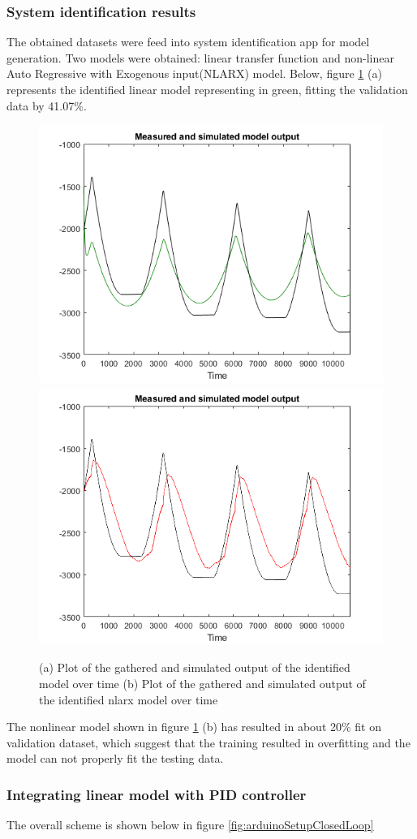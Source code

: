 \documentclass[]{final_report}
\begin{document}
\subsubsection{System identification results}
The obtained datasets were feed into system identification app for model generation.
Two models were obtained: linear transfer function and non-linear Auto Regressive with Exogenous input(NLARX) model. Below, figure \ref{fig:sysIdentfromSTMsetup} (a) represents the identified linear model representing in green, fitting the validation data by 41.07\%.  

\begin{figure} [h!]
\centerline{\includegraphics[width=.49\textwidth]{Screenshots for paper/arduino/tf_fixed_two_poles.png}
{\includegraphics[width=.49\textwidth]{Screenshots for paper/arduino/nlarx_model_fit.png}}}
\caption{(a) Plot of the gathered and simulated output of the identified model over time (b) Plot of the gathered and simulated output of the identified nlarx model over time }
\label{fig:sysIdentfromSTMsetup}
\end{figure}


The nonlinear model shown in figure \ref{fig:sysIdentfromSTMsetup} (b) has resulted in about 20\% fit on validation dataset, which suggest that the training resulted in overfitting and the model can not properly fit the testing data. 


\subsubsection{Integrating linear model with PID controller}
The overall scheme is shown below in figure \ref{fig:arduinoSetupClosedLoop}
\end{document}
